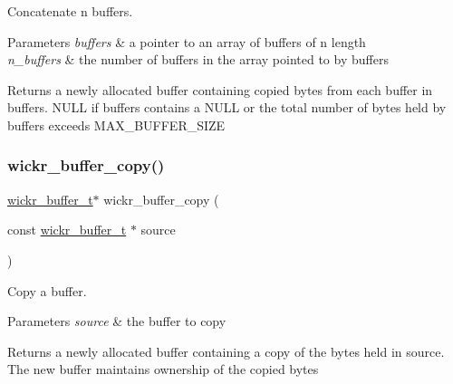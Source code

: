 Concatenate n buffers. 


\begin{DoxyParams}{Parameters}
{\em buffers} & a pointer to an array of buffers of n length \\
\hline
{\em n\+\_\+buffers} & the number of buffers in the array pointed to by buffers \\
\hline
\end{DoxyParams}
\begin{DoxyReturn}{Returns}
a newly allocated buffer containing copied bytes from each buffer in \textquotesingle{}buffers\textquotesingle{}. N\+U\+LL if \textquotesingle{}buffers\textquotesingle{} contains a N\+U\+LL or the total number of bytes held by \textquotesingle{}buffers\textquotesingle{} exceeds M\+A\+X\+\_\+\+B\+U\+F\+F\+E\+R\+\_\+\+S\+I\+ZE 
\end{DoxyReturn}
\mbox{\label{group__wickr__buffer_gada179dda91e748d7bdf6028d3d4c4bcd}} 
\subsubsection{\texorpdfstring{wickr\+\_\+buffer\+\_\+copy()}{wickr\_buffer\_copy()}}
{\footnotesize\ttfamily \hyperlink{structwickr__buffer}{wickr\+\_\+buffer\+\_\+t}$\ast$ wickr\+\_\+buffer\+\_\+copy (\begin{DoxyParamCaption}\item[{const \hyperlink{structwickr__buffer}{wickr\+\_\+buffer\+\_\+t} $\ast$}]{source }\end{DoxyParamCaption})}



Copy a buffer. 


\begin{DoxyParams}{Parameters}
{\em source} & the buffer to copy \\
\hline
\end{DoxyParams}
\begin{DoxyReturn}{Returns}
a newly allocated buffer containing a copy of the bytes held in source. The new buffer maintains ownership of the copied bytes 
\end{DoxyReturn}
\mbox{\label{group__wickr__buffer_gaceb6345c35ac2f6330ea0a685ce3fc53}} 
